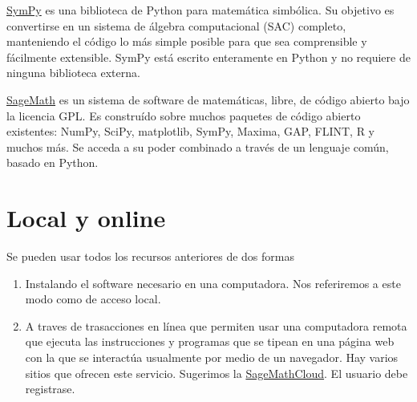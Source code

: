 \href{http://www.sympy.org/}{SymPy}
es una biblioteca de Python para matemática simbólica. Su objetivo es convertirse en un sistema de álgebra computacional (SAC) completo, manteniendo el código lo más simple posible para que sea comprensible y fácilmente extensible. SymPy está escrito enteramente en Python y no requiere de ninguna biblioteca externa.

\href{http://www.sagemath.org/}{SageMath}  es un sistema de software de matemáticas, libre, de código abierto bajo la licencia GPL. Es construído sobre  muchos paquetes de código abierto existentes: NumPy, SciPy, matplotlib, SymPy, Maxima, GAP, FLINT, R y muchos más. Se acceda a su poder combinado a través de un lenguaje común, basado en Python.




\section{Local y online} 

Se pueden usar todos los recursos anteriores de dos formas
\begin{enumerate}
\item Instalando el software necesario en una computadora. Nos referiremos a este modo como de acceso local.

\item A traves de trasacciones en línea que permiten usar una computadora remota que ejecuta las instrucciones y programas que se tipean en una página web con la que se interactúa usualmente por medio de un navegador.  Hay varios sitios que ofrecen este servicio. Sugerimos la \href{https://cloud.sagemath.com/}{SageMathCloud}. El usuario debe registrase.
\end{enumerate}



